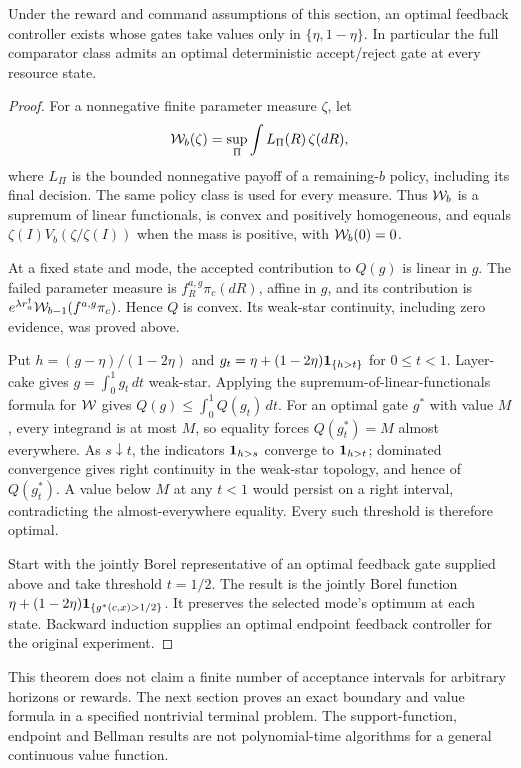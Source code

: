 \begin{theorem}\label{thm:endpoint}
Under the reward and command assumptions of this section, an optimal feedback controller exists whose gates take values only in $\{\eta,1-\eta\}$. In particular the full comparator class admits an optimal deterministic accept/reject gate at every resource state.
\end{theorem}
\begin{proof}
For a nonnegative finite parameter measure $\zeta$, let
\[
 \mathcal W_b(\zeta)=\sup_\Pi\int L_\Pi(R)\,\zeta(dR),
\]
where $L_\Pi$ is the bounded nonnegative payoff of a remaining-$b$ policy, including its final decision. The same policy class is used for every measure. Thus $\mathcal W_b$ is a supremum of linear functionals, is convex and positively homogeneous, and equals $\zeta(I)V_b(\zeta/\zeta(I))$ when the mass is positive, with $\mathcal W_b(0)=0$.

At a fixed state and mode, the accepted contribution to $Q(g)$ is linear in $g$. The failed parameter measure is $f_R^{a,g}\pi_c(dR)$, affine in $g$, and its contribution is $e^{\lambda r_a^\dagger}\mathcal W_{b-1}(f^{a,g}\pi_c)$. Hence $Q$ is convex. Its weak-star continuity, including zero evidence, was proved above.

Put $h=(g-\eta)/(1-2\eta)$ and $g_t=\eta+(1-2\eta)\mathbf1_{\{h>t\}}$ for $0\le t<1$. Layer-cake gives $g=\int_0^1g_t\,dt$ weak-star. Applying the supremum-of-linear-functionals formula for $\mathcal W$ gives $Q(g)\le\int_0^1Q(g_t)\,dt$. For an optimal gate $g^*$ with value $M$, every integrand is at most $M$, so equality forces $Q(g_t^*)=M$ almost everywhere. As $s\downarrow t$, the indicators $\mathbf1_{h>s}$ converge to $\mathbf1_{h>t}$; dominated convergence gives right continuity in the weak-star topology, and hence of $Q(g_t^*)$. A value below $M$ at any $t<1$ would persist on a right interval, contradicting the almost-everywhere equality. Every such threshold is therefore optimal.

Start with the jointly Borel representative of an optimal feedback gate supplied above and take threshold $t=1/2$. The result is the jointly Borel function
$\eta+(1-2\eta)\mathbf1_{\{g^*(c,x)>1/2\}}$. It preserves the selected mode's optimum at each state. Backward induction supplies an optimal endpoint feedback controller for the original experiment.
\end{proof}

This theorem does not claim a finite number of acceptance intervals for arbitrary horizons or rewards. The next section proves an exact boundary and value formula in a specified nontrivial terminal problem. The support-function, endpoint and Bellman results are not polynomial-time algorithms for a general continuous value function.
